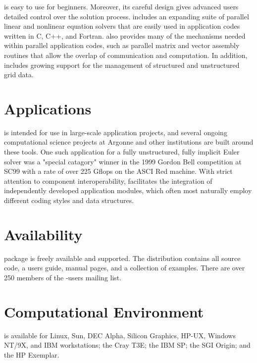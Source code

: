  is easy to use for beginners.  Moreover, its careful
design gives advanced users detailed control over the
solution process.  includes an expanding suite of parallel
linear and nonlinear equation solvers that are easily used in
application codes written in C, C++, and Fortran.   also
provides many of the mechanisms needed within parallel application
codes, such as parallel matrix and vector assembly routines
that allow the overlap of communication and computation.  In addition,
 includes growing support for the management of structured and
unstructured grid data.
\vsp

\section*{Applications}
 is intended for use in large-scale application projects,
and several ongoing computational science projects at Argonne and
other institutions are built around these tools.  
One such application for a fully unstructured, fully implicit Euler
solver was a "special catagory" winner in the 1999 Gordon Bell
competition at SC99 with a rate of over 225 Gflops on the ASCI
Red machine. 
With strict attention to component interoperability, 
facilitates the integration of independently developed application
modules, which often most naturally employ different coding styles and
data structures. 


\section*{Availability}

 package is freely available and supported.
The  distribution contains all source code, 
a users guide, manual pages, and a
collection of examples. There are over 250 members of the -users mailing list.

\section*{Computational Environment}
 is available for Linux, Sun, DEC Alpha, Silicon Graphics, HP-UX, Windows NT/9X, 
and IBM workstations; the Cray T3E; the IBM SP; the SGI Origin; and the HP Exemplar.

\vspace{-.1cm}
\makeinfo

